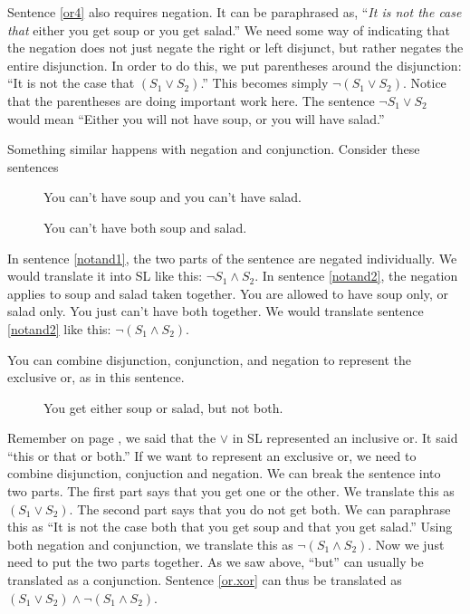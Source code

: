 Sentence \ref{or4} also requires negation. It can be paraphrased as, ``\emph{It is not the case that} either you get soup or you get salad.'' We need some way of indicating that the negation does not just negate the right or left disjunct, but rather negates the entire disjunction. In order to do this, we put parentheses around the disjunction: ``It is not the case that $(S_1 \lor S_2)$.'' This becomes simply $\lnot (S_1 \lor S_2)$. Notice that the parentheses are doing important work here. The sentence $\lnot S_1 \lor S_2$ would mean ``Either you will not have soup, or you will have salad.''

Something similar happens with negation and conjunction. Consider these sentences

\begin{description}
\item[] You can't have soup and you can't have salad.
\item[] You can't have both soup and salad.
\end{description}

In sentence \ref{notand1}, the two parts of the sentence are negated individually. We would translate it into SL like this: $\lnot S_1 \land $\lnot$ S_2$. In sentence \ref{notand2}, the negation applies to soup and salad taken together. You are allowed to have soup only, or salad only. You just can't have both together. We would translate sentence \ref{notand2} like this: $\lnot(S_1 \land S_2)$.

You can combine disjunction, conjunction, and negation to represent the exclusive or, as in this sentence.

\begin{description}
\item[] You get either soup or salad, but not both.
\end{description}

Remember on page \pageref{def:inclusive_or}, we said that the $\lor$ in SL represented an inclusive or. It said ``this or that or both.'' If we want to represent an exclusive or, we need to combine disjunction, conjuction and negation. We can break the sentence into two parts. The first part says that you get one or the other. We translate this as $(S_1 \lor S_2)$. The second part says that you do not get both. We can paraphrase this as ``It is not the case both that you get soup and that you get salad.'' Using both negation and conjunction, we translate this as $\lnot(S_1 \land S_2)$. Now we just need to put the two parts together. As we saw above, ``but'' can usually be translated as a conjunction. Sentence \ref{or.xor} can thus be translated as $(S_1 \lor S_2) \land \lnot(S_1 \land S_2)$.



